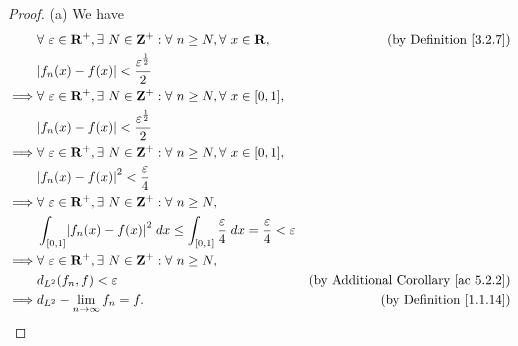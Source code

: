 \begin{proof}{(a)}
    We have
    \begin{align*}
                 & \forall\ \varepsilon \in \mathbf{R}^+, \exists\ N \in \mathbf{Z}^+ : \forall\ n \geq N, \forall\ x \in \mathbf{R},              & \text{(by Definition \ref{3.2.7})}              \\
                 & \abs*{f_n(x) - f(x)} < \frac{\varepsilon^{\frac{1}{2}}}{2}                                                                                                                        \\
        \implies & \forall\ \varepsilon \in \mathbf{R}^+, \exists\ N \in \mathbf{Z}^+ : \forall\ n \geq N, \forall\ x \in [0, 1],                                                                    \\
                 & \abs*{f_n(x) - f(x)} < \frac{\varepsilon^{\frac{1}{2}}}{2}                                                                                                                        \\
        \implies & \forall\ \varepsilon \in \mathbf{R}^+, \exists\ N \in \mathbf{Z}^+ : \forall\ n \geq N, \forall\ x \in [0, 1],                                                                    \\
                 & \abs*{f_n(x) - f(x)}^2 < \frac{\varepsilon}{4}                                                                                                                                    \\
        \implies & \forall\ \varepsilon \in \mathbf{R}^+, \exists\ N \in \mathbf{Z}^+ : \forall\ n \geq N,                                                                                           \\
                 & \int_{[0, 1]} \abs*{f_n(x) - f(x)}^2 \; dx \leq \int_{[0, 1]} \frac{\varepsilon}{4} \; dx = \frac{\varepsilon}{4} < \varepsilon                                                   \\
        \implies & \forall\ \varepsilon \in \mathbf{R}^+, \exists\ N \in \mathbf{Z}^+ : \forall\ n \geq N,                                                                                           \\
                 & d_{L^2}(f_n, f) < \varepsilon                                                                                                   & \text{(by Additional Corollary \ref{ac 5.2.2})} \\
        \implies & d_{L^2} - \lim_{n \to \infty} f_n = f.                                                                                          & \text{(by Definition \ref{1.1.14})}
    \end{align*}
\end{proof}

